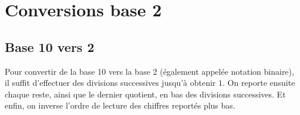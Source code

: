 \documentclass[11pt,a4paper]{article}
\begin{document}
\medskip


\section{Conversions base 2}

\subsection{Base 10 vers 2}

Pour convertir de la base 10 vers la base 2 (également appelée notation binaire), il suffit d'effectuer des divisions successives jusqu'à obtenir $ 1 $.
On reporte ensuite chaque reste, ainsi que le dernier quotient, en bas des divisions successives.
Et enfin, on inverse l'ordre de lecture des chiffres reportés plus bas.

\medskip
\end{document}
